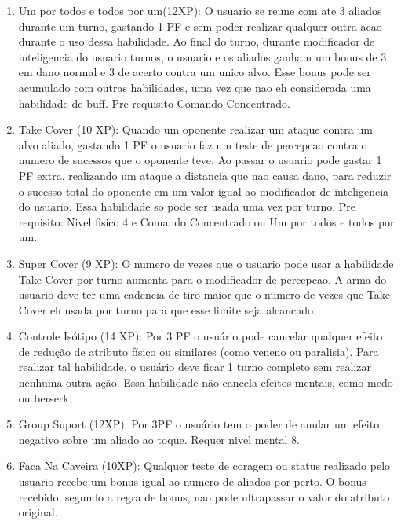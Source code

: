 \begin{enumerate}
 	\item Um por todos e todos por um(12XP): O usuario se reune com ate 3 aliados durante um turno, gastando 1 PF e sem poder realizar qualquer outra acao durante o uso dessa habilidade. Ao final do turno, durante modificador de inteligencia do usuario turnos, o usuario e os aliados ganham um bonus de 3 em dano normal e 3 de acerto contra um unico alvo.  Esse bonus pode ser acumulado com outras habilidades, uma vez que nao eh considerada uma habilidade de buff. Pre requisito Comando Concentrado.
 	
 	\item Take Cover (10 XP): Quando um oponente realizar um ataque contra um alvo aliado, gastando 1 PF o usuario faz um teste de percepcao contra o numero de sucessos que o oponente teve. Ao passar o usuario pode gastar 1 PF extra, realizando um ataque a distancia que nao causa dano, para reduzir o sucesso total do oponente em um valor igual ao modificador de inteligencia do usuario. Essa habilidade so pode ser usada uma vez por turno. Pre requisito: Nivel fisico 4 e Comando Concentrado ou Um por todos e todos por um.
 	
 	\item Super Cover (9 XP): O numero de vezes que o usuario pode usar a habilidade Take Cover por turno aumenta para o modificador de percepcao. A arma do usuario deve ter uma cadencia de tiro maior que o numero de vezes que Take Cover eh usada por turno para que esse limite seja alcancado.

	\item Controle Isótipo (14 XP): Por 3 PF o usuário pode cancelar qualquer efeito de redução de atributo físico ou similares (como veneno ou paralisia). Para realizar tal habilidade, o usuário deve ficar 1 turno completo sem realizar nenhuma outra ação. Essa habilidade não cancela efeitos mentais, como medo ou berserk.
	
	\item Group Suport (12XP): Por 3PF o usuário tem o poder de anular um efeito negativo sobre um aliado ao toque. Requer nivel mental 8.

    \item Faca Na Caveira (10XP): Qualquer teste de coragem ou status realizado pelo usuario recebe um bonus igual ao numero de aliados por perto. O bonus recebido, segundo a regra de bonus, nao pode ultrapassar o valor do atributo original.
	

\end{enumerate}
